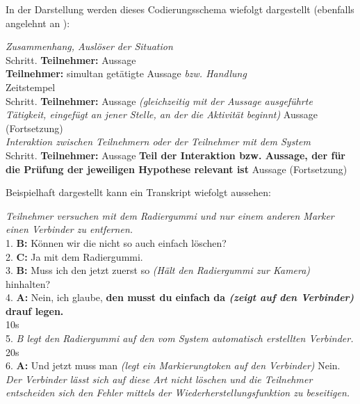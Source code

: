 In der Darstellung werden dieses Codierungsschema wiefolgt dargestellt (ebenfalls angelehnt an \citet{Hornecker04}):
\begin{transkript}
	\emph{Zusammenhang, Auslöser der Situation}\\
	Schritt. \textbf{Teilnehmer:} Aussage\\
	\textbf{Teilnehmer:} simultan getätigte Aussage \emph{bzw. Handlung}\\
	Zeitstempel\\	
	Schritt. \textbf{Teilnehmer:} Aussage \emph{(gleichzeitig mit der Aussage ausgeführte Tätigkeit, eingefügt an jener Stelle, an der die Aktivität beginnt)} Aussage (Fortsetzung)\\
	\emph{Interaktion zwischen Teilnehmern oder der Teilnehmer mit dem System}\\
	Schritt. \textbf{Teilnehmer:} Aussage \textbf{Teil der Interaktion bzw. Aussage, der für die Prüfung der jeweiligen Hypothese relevant ist} Aussage (Fortsetzung)\\
\end{transkript}


Beispielhaft dargestellt kann ein Transkript wiefolgt aussehen:
\begin{transkript}
	\emph{Teilnehmer versuchen mit dem Radiergummi und nur einem anderen Marker einen Verbinder zu entfernen.}\\
	1. \textbf{B:} Können wir die nicht so auch einfach löschen?\\
	2. \textbf{C:} Ja mit dem Radiergummi.\\
	3. \textbf{B:} Muss ich den jetzt zuerst so \emph{(Hält den Radiergummi zur Kamera)} hinhalten?\\
	4. \textbf{A:} Nein, ich glaube, \textbf{den musst du einfach da \emph{(zeigt auf den Verbinder)} drauf legen.}\\
	10s\\
	5. \emph{B legt den Radiergummi auf den vom System automatisch erstellten Verbinder.}\\
	20s\\
	6. \textbf{A:} Und jetzt muss man \emph{(legt ein Markierungtoken auf den Verbinder)} Nein.\\
	\emph{Der Verbinder lässt sich auf diese Art nicht löschen und die Teilnehmer entscheiden sich den Fehler mittels der Wiederherstellungsfunktion zu beseitigen.}
\end{transkript}


